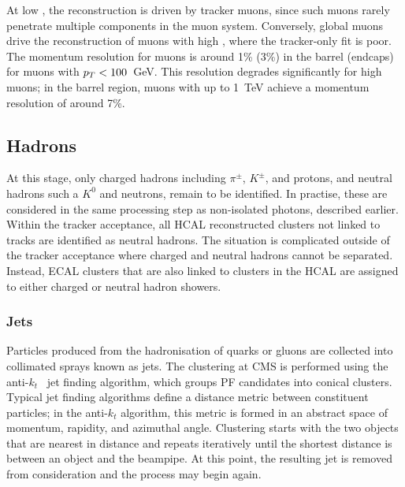 \noindent At low \pt, the reconstruction is driven by tracker muons, since such muons rarely penetrate multiple components in the muon system. Conversely, global muons drive the reconstruction of muons with high \pt, where the tracker-only fit is poor. The momentum resolution for muons is around 1\% (3\%) in the barrel (endcaps) for muons with $p_T<100$~GeV. This resolution degrades significantly for high \pt muons; in the barrel region, muons with \pt up to 1~TeV achieve a momentum resolution of around 7\%.

\subsection{Hadrons}
\label{subsec:hadrons_and_jets}

At this stage, only charged hadrons including $\pi^{\pm}$, $K^{\pm}$, and protons, and neutral hadrons such a $K^{0}$ and neutrons, remain to be identified. In practise, these are considered in the same processing step as non-isolated photons, described earlier. Within the tracker acceptance, all HCAL reconstructed clusters not linked to tracks are identified as neutral hadrons. The situation is complicated outside of the tracker acceptance where charged and neutral hadrons cannot be separated. Instead, ECAL clusters that are also linked to clusters in the HCAL are assigned to either charged or neutral hadron showers.

\subsubsection{Jets}


Particles produced from the hadronisation of quarks or gluons are collected into collimated sprays known as jets. The clustering at CMS is performed using the anti-$k_{t}$~\cite{anti-kt} jet finding algorithm, which groups PF candidates into conical clusters. Typical jet finding algorithms define a distance metric between constituent particles; in the anti-$k_{t}$ algorithm, this metric is formed in an abstract space of momentum, rapidity, and azimuthal angle. Clustering starts with the two objects that are nearest in distance and repeats iteratively until the shortest distance is between an object and the beampipe. At this point, the resulting jet is removed from consideration and the process may begin again.
    

